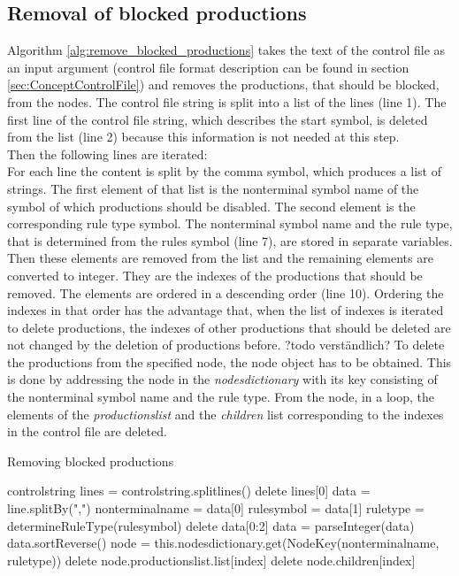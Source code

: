 \subsection{Removal of blocked productions}
Algorithm \ref{alg:remove_blocked_productions} takes the text of the control file as an input argument (control file format description can be found in section \ref{sec:ConceptControlFile}) and removes the productions, that should be blocked, from the nodes.  
The control file string is split into a list of the lines (line 1).
The first line of the control file string, which describes the start symbol, is deleted from the list (line 2) because this information is not needed at this step.\\
Then the following lines are iterated:\\
For each line the content is split by the comma symbol, which produces a list of strings.
The first element of that list is the nonterminal symbol name of the symbol of which productions should be disabled.
The second element is the corresponding rule type symbol.
The nonterminal symbol name and the rule type, that is determined from the rules symbol (line 7), are stored in separate variables.
Then these elements are removed from the list and the remaining elements are converted to integer.
They are the indexes of the productions that should be removed.
The elements are ordered in a descending order (line 10).
Ordering the indexes in that order has the advantage that, when the list of indexes is iterated to delete productions, the indexes of other productions that should be deleted are not changed by the deletion of productions before. ?todo verständlich?
To delete the productions from the specified node, the node object has to be obtained.
This is done by addressing the node in the \textit{nodes\textunderscore dictionary} with its key consisting of the nonterminal symbol name and the rule type.
From the node, in a loop, the elements of the \textit{productions\textunderscore list} and the \textit{children} list corresponding to the indexes in the control file are deleted.

\begin{algorithm}[H]
\caption{Removing blocked productions}
\begin{algorithmic}[1] 
\Require control\textunderscore string
\State lines = control\textunderscore string.splitlines()
\State delete lines[0]
	\State data = line.splitBy(",")
	\State nonterminal\textunderscore name = data[0]
	\State rule\textunderscore symbol = data[1]
	\State rule\textunderscore type = determineRuleType(rule\textunderscore symbol)
	\State delete data[0:2]
	\State data = parseInteger(data)
	\State data.sortReverse()
	\State node = this.nodes\textunderscore dictionary.get(Node\textunderscore Key(nonterminal\textunderscore name, rule\textunderscore type))
		\State delete node.productions\textunderscore list.list[index]
		\State delete node.children[index]
	\EndFor
\EndFor
\end{algorithmic}
\label{alg:remove_blocked_productions}
\end{algorithm}

